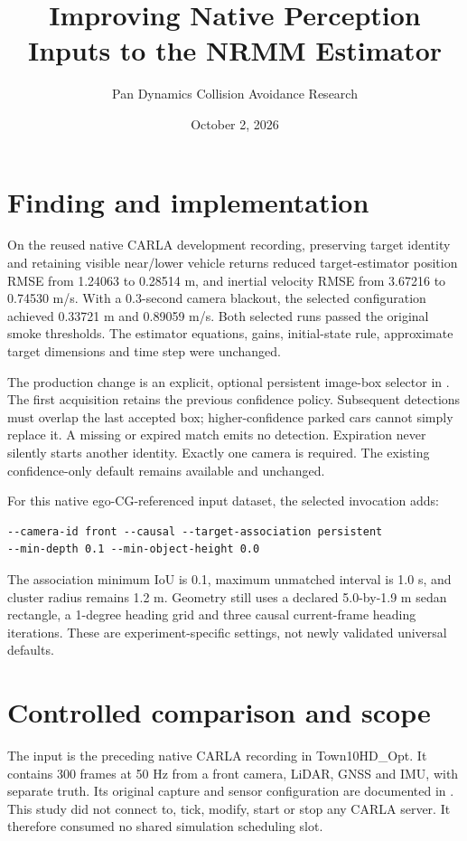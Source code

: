 \documentclass[11pt]{article}
\title{Improving Native Perception Inputs to the NRMM Estimator}
\author{Pan Dynamics Collision Avoidance Research}
\date{October 2, 2026}
\begin{document}
\maketitle

\section{Finding and implementation}
On the reused native CARLA development recording, preserving target identity
and retaining visible near/lower vehicle returns reduced target-estimator
position RMSE from 1.24063 to 0.28514 m, and inertial velocity RMSE from
3.67216 to 0.74530 m/s. With a 0.3-second camera blackout, the selected
configuration achieved 0.33721 m and 0.89059 m/s. Both selected runs passed
the original smoke thresholds. The estimator equations, gains, initial-state
rule, approximate target dimensions and time step were unchanged.

The production change is an explicit, optional persistent image-box selector
in . The first acquisition
retains the previous confidence policy. Subsequent detections must overlap
the last accepted box; higher-confidence parked cars cannot simply replace
it. A missing or expired match emits no detection. Expiration never silently
starts another identity. Exactly one camera is required. The existing
confidence-only default remains available and unchanged.

For this native ego-CG-referenced input dataset, the selected invocation adds:
\begin{verbatim}
--camera-id front --causal --target-association persistent
--min-depth 0.1 --min-object-height 0.0
\end{verbatim}
The association minimum IoU is 0.1, maximum unmatched interval is 1.0 s,
and cluster radius remains 1.2 m. Geometry still uses a declared 5.0-by-1.9 m
sedan rectangle, a 1-degree heading grid and three causal current-frame
heading iterations. These are experiment-specific settings, not newly
validated universal defaults.

\section{Controlled comparison and scope}
The input is the preceding native CARLA recording in Town10HD\_Opt.
It contains 300 frames at 50 Hz from a front camera, LiDAR, GNSS and IMU,
with separate truth.
Its original capture and sensor configuration are documented in
. This study did not connect
to, tick, modify, start or stop any CARLA server. It therefore consumed no
shared simulation scheduling slot.
\end{document}

